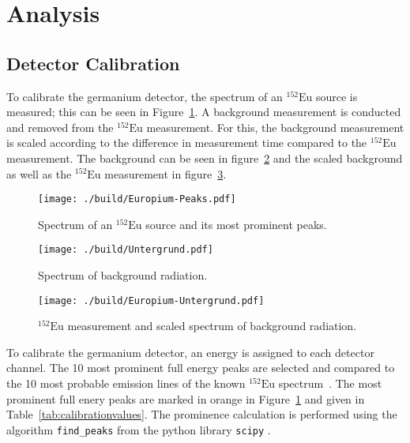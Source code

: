 \section{Analysis}
\subsection{Detector Calibration}
To calibrate the germanium detector, the spectrum of an $^{152}\text{Eu}$
source is measured; this can be seen in Figure~\ref{fig:spectrumeu}. A
background measurement is conducted and removed from the $^{152}\text{Eu}$
measurement. For this, the background measurement is scaled according to
the difference in measurement time compared to the $^{152}\text{Eu}$
measurement. The background can be seen in figure~\ref{fig:background} and
the scaled background as well as the $^{152}\text{Eu}$ measurement in
figure~\ref{fig:eubackground}.
\begin{figure}
	\centering
	\begin{adjustbox}{width=1.4\textwidth, center}
		\texttt{[image: ./build/Europium-Peaks.pdf]}
	\end{adjustbox}
	\caption{Spectrum of an $^{152}\text{Eu}$ source and its most prominent peaks.}
	\label{fig:spectrumeu}
\end{figure}
\begin{figure}
	\centering
	\begin{adjustbox}{width=1.4\textwidth, center}
		\texttt{[image: ./build/Untergrund.pdf]}
	\end{adjustbox}
	\caption{Spectrum of background radiation.}
	\label{fig:background}
\end{figure}
\begin{figure}
	\centering
	\begin{adjustbox}{width=1.4\textwidth, center}
		\texttt{[image: ./build/Europium-Untergrund.pdf]}
	\end{adjustbox}
	\caption{$^{152}\text{Eu}$ measurement and scaled spectrum of background radiation.}
	\label{fig:eubackground}
\end{figure}
\noindent
To calibrate the germanium detector, an energy is assigned to each detector channel.
The 10 most prominent full energy peaks are selected and compared to the 10 most probable emission
lines of the known $^{152}\text{Eu}$ spectrum~\cite{laraweb}. The most prominent full enery peaks are marked in
orange in Figure~\ref{fig:spectrumeu} and given in Table~\ref{tab:calibrationvalues}. The prominence
calculation is performed using the algorithm \texttt{find\_peaks} from the python library \texttt{scipy} \cite{scipy}.
